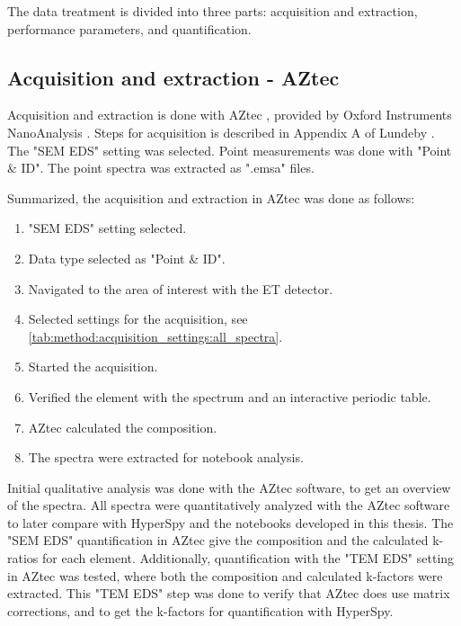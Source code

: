 The data treatment is divided into three parts: acquisition and extraction, performance parameters, and quantification.

\subsection{Acquisition and extraction - AZtec}
\label{method:data_treatment:aztec}

Acquisition and extraction is done with AZtec , provided by Oxford Instruments NanoAnalysis \cite{aztec_manual}.
Steps for acquisition is described in Appendix A of Lundeby \cite{lundeby_improving_2019}.
The "SEM EDS" setting was selected.
Point measurements was done with "Point \& ID". 
The point spectra was extracted as ".emsa" files.

Summarized, the acquisition and extraction in AZtec was done as follows:
\begin{enumerate}
    \item "SEM EDS" setting selected.
    \item Data type selected as "Point \& ID".
    \item Navigated to the area of interest with the ET detector.
    \item Selected settings for the acquisition, see \cref{tab:method:acquisition_settings:all_spectra}.
    \item Started the acquisition.
    \item Verified the element with the spectrum and an interactive periodic table.
    \item AZtec calculated the composition.
    \item The spectra were extracted for notebook analysis.
\end{enumerate}


Initial qualitative analysis was done with the AZtec software, to get an overview of the spectra.
All spectra were quantitatively analyzed with the AZtec software to later compare with HyperSpy and the notebooks developed in this thesis.
The "SEM EDS" quantification in AZtec give the composition and the calculated k-ratios for each element.
Additionally, quantification with the "TEM EDS" setting in AZtec was tested, where both the composition and calculated k-factors were extracted.
This "TEM EDS" step was done to verify that AZtec does use matrix corrections, and to get the k-factors for quantification with HyperSpy.




